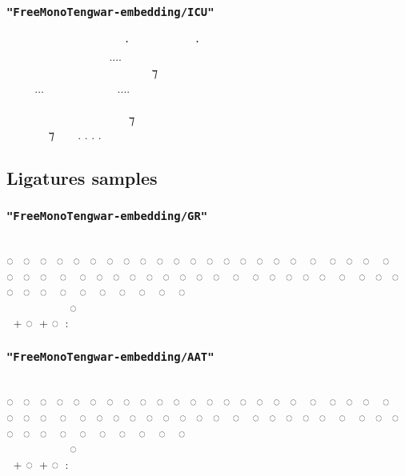 \documentclass{article}
\begin{document}
\subsubsection*{\texttt{"FreeMonoTengwar-embedding/ICU"}}

\embedICU
  ‍   ⸱‍  ‍ ⸱ \\
    ‍....  ‍  \\
  ‍   ‍ ‍ ⁊ ‍  \\
...  ....   \\
         ‍ \\
 ‍ ‍‍   ⁊  ‍ ‍ \\
 ‍ ⁊  . . . . \normalfont


\newpage

\subsection{Ligatures samples}

\subsubsection*{\texttt{"FreeMonoTengwar-embedding/GR"}}

\embedGR
                          \\
◌ ◌ ◌ ◌ ◌ ◌ ◌ ◌ ◌ ◌ ◌ ◌ ◌ ◌ ◌ ◌ ◌ ◌ ◌ ◌ ◌ ◌ ◌ ◌ ◌ ◌ ◌ ◌ ◌ ◌ ◌ ◌ ◌ ◌ ◌ ◌ ◌ ◌ ◌ ◌ ◌ ◌ ◌ ◌ ◌ ◌ ◌ ◌ ◌ ◌ ◌ ◌ ◌ ◌ ◌ ◌\\
      ◌‍ ‍ ‍ ‍ \\
 \normalfont + \embedGR ◌ \normalfont + \embedGR ◌ : 

\subsubsection*{\texttt{"FreeMonoTengwar-embedding/AAT"}}

\embedAAT
                          \\
◌ ◌ ◌ ◌ ◌ ◌ ◌ ◌ ◌ ◌ ◌ ◌ ◌ ◌ ◌ ◌ ◌ ◌ ◌ ◌ ◌ ◌ ◌ ◌ ◌ ◌ ◌ ◌ ◌ ◌ ◌ ◌ ◌ ◌ ◌ ◌ ◌ ◌ ◌ ◌ ◌ ◌ ◌ ◌ ◌ ◌ ◌ ◌ ◌ ◌ ◌ ◌ ◌ ◌ ◌ ◌\\
      ◌‍ ‍ ‍ ‍ \\
 \normalfont + \embedAAT ◌ \normalfont + \embedAAT ◌ : 
\end{document}
